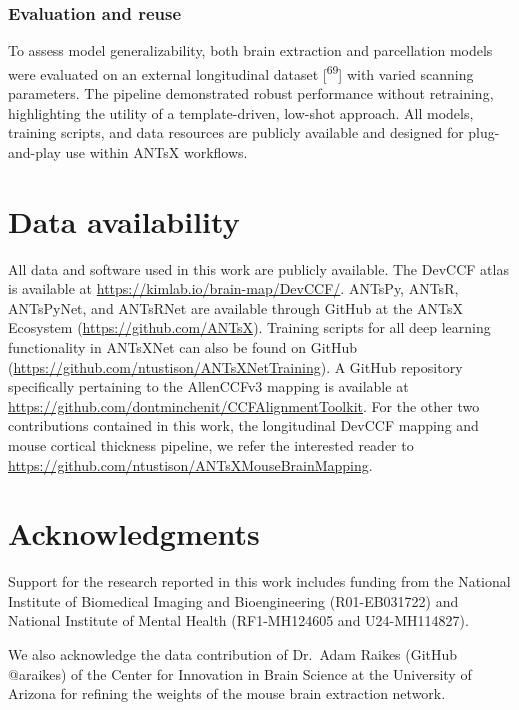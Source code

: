 \documentclass[
  12pt,
]{article}
\begin{document}
\subsubsection{Evaluation and reuse}\label{evaluation-and-reuse}

To assess model generalizability, both brain extraction and parcellation
models were evaluated on an external longitudinal dataset
{[}\textsuperscript{69}{]} with varied scanning parameters. The pipeline
demonstrated robust performance without retraining, highlighting the
utility of a template-driven, low-shot approach. All models, training
scripts, and data resources are publicly available and designed for
plug-and-play use within ANTsX workflows.

\clearpage

\section*{Data availability}\label{data-availability}

All data and software used in this work are publicly available. The
DevCCF atlas is available at \url{https://kimlab.io/brain-map/DevCCF/}.
ANTsPy, ANTsR, ANTsPyNet, and ANTsRNet are available through GitHub at
the ANTsX Ecosystem (\url{https://github.com/ANTsX}). Training scripts
for all deep learning functionality in ANTsXNet can also be found on
GitHub (\url{https://github.com/ntustison/ANTsXNetTraining}). A GitHub
repository specifically pertaining to the AllenCCFv3 mapping is
available at \url{https://github.com/dontminchenit/CCFAlignmentToolkit}.
For the other two contributions contained in this work, the longitudinal
DevCCF mapping and mouse cortical thickness pipeline, we refer the
interested reader to
\url{https://github.com/ntustison/ANTsXMouseBrainMapping}.

\clearpage

\section*{Acknowledgments}\label{acknowledgments}

Support for the research reported in this work includes funding from the
National Institute of Biomedical Imaging and Bioengineering
(R01-EB031722) and National Institute of Mental Health (RF1-MH124605 and
U24-MH114827).

We also acknowledge the data contribution of Dr.~Adam Raikes (GitHub
@araikes) of the Center for Innovation in Brain Science at the
University of Arizona for refining the weights of the mouse brain
extraction network.
\end{document}
